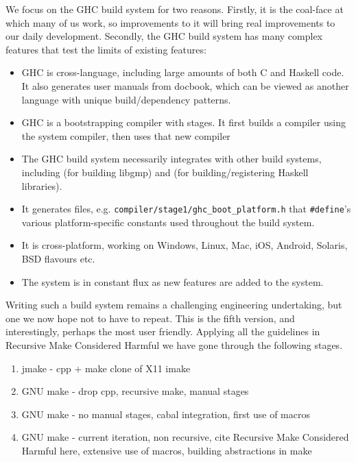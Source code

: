 We focus on the GHC build system for two reasons. Firstly, it is the coal-face
at which many of us work, so improvements to it will bring real improvements to
our daily development. Secondly, the GHC build system has many complex features
that test the limits of existing features:

\begin{itemize}
\item GHC is cross-language, including large amounts of both C and Haskell code.
It also generates user manuals from docbook, which can be viewed as another
language with unique build/dependency patterns.
\item GHC is a bootstrapping compiler with stages. It first builds a compiler
using the system compiler, then uses that new compiler
\item The GHC build system necessarily integrates with other build systems,
including \make{} (for building libgmp) and \cabal{} (for building/registering
Haskell libraries).
\item It generates files, e.g. \texttt{compiler/stage1/ghc\_boot\_platform.h}
that \texttt{\#define}'s various platform-specific constants used throughout the
build system.
\item It is cross-platform, working on Windows, Linux, Mac, iOS, Android,
Solaris, BSD flavours etc.
\item The system is in constant flux as new features are added to the system.
\end{itemize}

Writing such a build system remains a challenging engineering undertaking, but
one we now hope not to have to repeat. This is the fifth version, and interestingly, perhaps the most user friendly. Applying all the guidelines in Recursive Make Considered Harmful we have gone through the following stages.

\begin{enumerate}
  \item jmake - cpp + make clone of X11 imake
  \item GNU make - drop cpp, recursive make, manual stages
  \item GNU make - no manual stages, cabal integration, first
   use of macros
   \item GNU make - current iteration, non recursive, cite Recursive
     Make Considered Harmful here, extensive use of macros,
     building abstractions in make
\end{enumerate}
